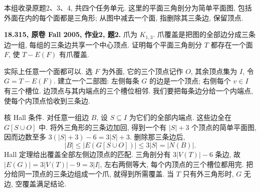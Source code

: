 本组收录原题2、3、4, 共四个任务单元. 这里的平面三角剖分为简单平面图,
包括外面在内的每个面都是三角形; 从图中减去一个面, 指删除其三条边, 保留顶点.

\begin{exercise}\label{mit:18315-hw2-q2}
\textbf{18.315, 原卷 Fall 2005, 作业2, 题2.}
爪为 $K_{1,3}$. 爪覆盖是把图的全部边分成三条边一组,
每组的三条边共享一个中心顶点. 证明每个平面三角剖分 $T$
都存在一个面 $F$, 使 $T-E(F)$ 有爪覆盖.
\end{exercise}
\begin{solution}
实际上任意一个面都可以. 选 $F$ 为外面, 它的三个顶点记作 $O$,
其余顶点集为 $I$, 令 $G=T-E(F)$.
建立一个二部图: 左侧每条 $G$ 的边是一个顶点;
右侧每个 $v\in I$ 有三个槽位. 边顶点与其内端点的三个槽位相邻.
我们要把每条边分给一个内端点, 使每个内顶点恰收到三条边.

核 Hall 条件. 对任意一组边 $B$, 设 $S\subseteq I$ 为它们的全部内端点.
这些边全在 $G[S\cup O]$ 中. 将外三角形的三条边加回,
得到一个有 $|S|+3$ 个顶点的简单平面图, 因而边数至多
$3(|S|+3)-6=3|S|+3$. 删除那三条边后,
\[
|B|\le |E(G[S\cup O])|\le3|S|=|N(B)|.
\]
Hall 定理给出覆盖全部左侧边顶点的匹配.
三角剖分有 $3|V(T)|-6$ 条边, 故
$|E(G)|=3|V(T)|-9=3|I|$, 左右两侧等大,
每个内顶点的三个槽位都用完. 把分给同一顶点的三条边组成一个爪,
就得到所需覆盖. 当 $T$ 只有外三角形时, $G$ 无边, 空覆盖满足结论.
\end{solution}

